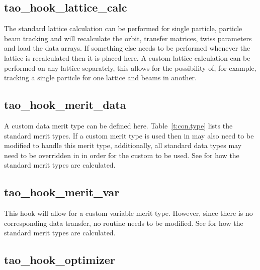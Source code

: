 \subsection{tao\_hook\_lattice\_calc}

The standard lattice calculation can be performed for single particle,
particle beam tracking and will recalculate the
orbit, transfer matrices, twiss parameters and load the data
arrays. If something else needs to be performed whenever the lattice
is recalculated then it is placed here. A custom lattice calculation
can be performed on any lattice separately, this allows for the
possibility of, for example, tracking a single particle for one
lattice and beams in another.

\subsection{tao\_hook\_merit\_data}

A custom data merit type can be defined here. Table~\ref{t:con.type}
lists the standard merit types. If a custom merit type is used then
 in  may also need to be
modified to handle this merit type, additionally, all standard data
types may need to be overridden in  in
order for the custom  to be used.  See
 for how the standard merit types are
calculated.

\subsection{tao\_hook\_merit\_var}

This hook will allow for a custom variable merit type. However, since
there is no corresponding data transfer, no  routine needs
to be modified.  See  for how the standard
merit types are calculated.

\subsection{tao\_hook\_optimizer}

